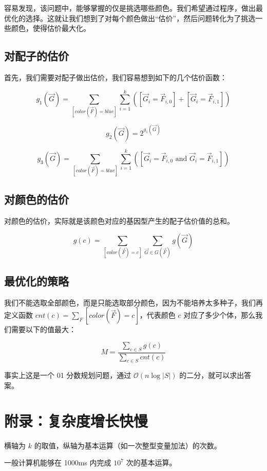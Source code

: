 \documentclass[12pt]{article} %
\begin{document}
容易发现，该问题中，能够掌握的仅是挑选哪些颜色。我们希望通过程序，做出最优化的选择。这就让我们想到了对每个颜色做出“估价”，然后问题转化为了挑选一些颜色，使得估价最大化。

\subsection{对配子的估价}

首先，我们需要对配子做出估价，我们容易想到如下的几个估价函数：

$$g_1(\vec G)=\sum_{[color(\vec F)=blue]} \sum_{i=1}^k ([\vec G_i=\vec F_{i,0}]+[\vec G_i=\vec F_{i,1}])$$

$$g_2(\vec G)=2^{g_1(\vec G)}$$

$$g_3(\vec G)=\sum_{[color(\vec F)=blue]} \sum_{i=1}^k ([\vec G_i=\vec F_{i,0} \text{ and } \vec G_i=\vec F_{i,1}])$$

\subsection{对颜色的估价}

对颜色的估价，实际就是该颜色对应的基因型产生的配子估价值的总和。

$$g(c)=\sum_{[color(\vec F)=c]} \sum_{\vec G \in G(\vec F)} g(\vec G)$$

\subsection{最优化的策略}

我们不能选取全部颜色，而是只能选取部分颜色，因为不能培养太多种子，我们再定义函数 $cnt(c)=\sum_F [color(\vec F)=c]$，代表颜色 $c$ 对应了多少个体，那么我们需要以下的值最大：

$$M=\frac{\sum_{c \in S} g(c)}{\sum_{c\in S}{cnt(c)}}$$

事实上这是一个 01 分数规划问题，通过 $\mathcal O(n \log |S|)$ 的二分，就可以求出答案。

\section{附录：复杂度增长快慢}

\begin{center}
\end{center}

横轴为 $k$ 的取值，纵轴为基本运算（如一次整型变量加法）的次数。

一般计算机能够在 1000ms 内完成 $10^7$ 次的基本运算。

\newpage

\end{document}
